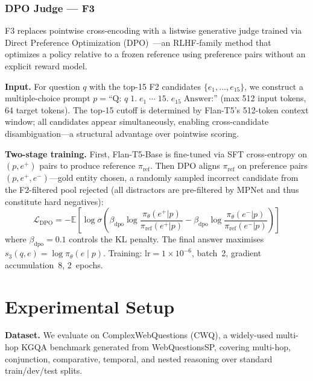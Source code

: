 \documentclass[10pt,conference]{IEEEtran}
\begin{document}
\subsubsection{DPO Judge — F3}
\label{sec:stage3_dpo}
F3 replaces pointwise cross-encoding with a listwise generative judge trained via Direct Preference Optimization (DPO)~\cite{rafailov2023direct}—an RLHF-family method that optimizes a policy relative to a frozen reference using preference pairs without an explicit reward model.

\textbf{Input.} For question $q$ with the top-15 F2 candidates $\{e_1,\dots,e_{15}\}$, we construct a multiple-choice prompt $p = \text{``Q:~}q\;\text{1.}\;e_1\;\cdots\;\text{15.}\;e_{15}\;\text{Answer:''}$ (max 512 input tokens, 64 target tokens). The top-15 cutoff is determined by Flan-T5's 512-token context window; all candidates appear simultaneously, enabling cross-candidate disambiguation—a structural advantage over pointwise scoring.

\textbf{Two-stage training.} First, Flan-T5-Base is fine-tuned via SFT cross-entropy on $(p, e^+)$ pairs to produce reference $\pi_{\text{ref}}$. Then DPO aligns $\pi_{\text{ref}}$ on preference pairs $(p, e^+, e^-)$—gold entity chosen, a randomly sampled incorrect candidate from the F2-filtered pool rejected (all distractors are pre-filtered by MPNet and thus constitute hard negatives):
\begin{equation}
\label{eq:dpo}
\mathcal{L}_{\text{DPO}} = -\mathbb{E}\!\left[
  \log \sigma\!\left(
    \beta_{\text{dpo}} \log \frac{\pi_\theta(e^+|p)}{\pi_{\text{ref}}(e^+|p)}
    - \beta_{\text{dpo}} \log \frac{\pi_\theta(e^-|p)}{\pi_{\text{ref}}(e^-|p)}
  \right)
\right]
\end{equation}
where $\beta_{\text{dpo}}=0.1$ controls the KL penalty. The final answer maximises $s_3(q,e)=\log\pi_\theta(e\mid p)$. Training: lr$=1{\times}10^{-6}$, batch~2, gradient accumulation~8, 2~epochs.




\section{Experimental Setup}

\textbf{Dataset.} We evaluate on ComplexWebQuestions (CWQ), a widely-used multi-hop KGQA benchmark generated from WebQuestionsSP, covering multi-hop, conjunction, comparative, temporal, and nested reasoning over standard train/dev/test splits.
\end{document}
